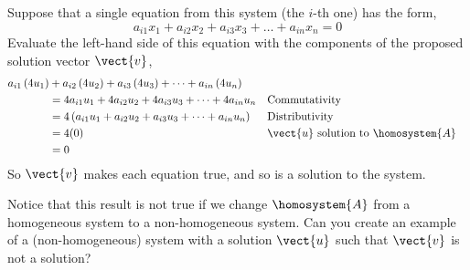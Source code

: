 Suppose that a single equation from this system  (the $i$-th one) has the form,
%
\begin{equation*}
a_{i1}x_1+a_{i2}x_2+a_{i3}x_3+\dots+a_{in}x_n=0
\end{equation*}
%
Evaluate the left-hand side of this equation with the components of the proposed solution vector $\vect{v}$,
%
\begin{align*}
a_{i1}\left(4u_1\right)&+a_{i2}\left(4u_2\right)+a_{i3}\left(4u_3\right)+\dots+a_{in}\left(4u_n\right)\\
&=4a_{i1}u_1+4a_{i2}u_2+4a_{i3}u_3+\dots+4a_{in}u_n&&\text{Commutativity}\\
%
&=4\left(a_{i1}u_1+a_{i2}u_2+a_{i3}u_3+\dots+a_{in}u_n\right)&&\text{Distributivity}\\
%
&=4(0)&&\text{$\vect{u}$ solution to $\homosystem{A}$}\\
&=0
\end{align*}
%
So $\vect{v}$ makes each equation true, and so is a solution to the system.\par
%
Notice that this result is not true if we change $\homosystem{A}$ from a homogeneous system to a non-homogeneous system.  Can you create an example of a (non-homogeneous) system with a solution $\vect{u}$ such that $\vect{v}$ is not a solution?
